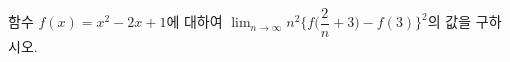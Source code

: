 함수 $f(x)=x^2-2x+1$에 대하여 $\displaystyle\lim_{n\to\infty} n^2\Big\{f\Big(\dfrac{2}{n}+3\Big)-f(3)\Big\}^2$의 값을 구하시오.
